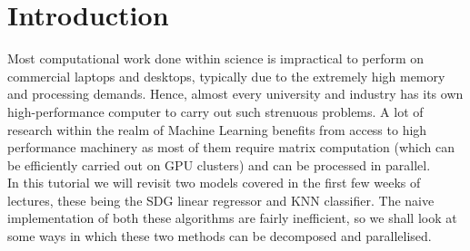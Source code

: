 \section{Introduction}

Most computational work done within science is impractical to perform on commercial laptops and desktops, typically due to the extremely high memory and processing demands. Hence, almost every university and industry has its own high-performance computer to carry out such strenuous problems. A lot of research within the realm of Machine Learning benefits from access to high performance machinery as most of them require matrix computation (which can be efficiently carried out on GPU clusters) and can be processed in parallel.\\[1\baselineskip]
In this tutorial we will revisit two models covered in the first few weeks of lectures, these being the SDG linear regressor and KNN classifier. The naive implementation of both these algorithms are fairly inefficient, so we shall look at some ways in which these two methods can be decomposed and parallelised.